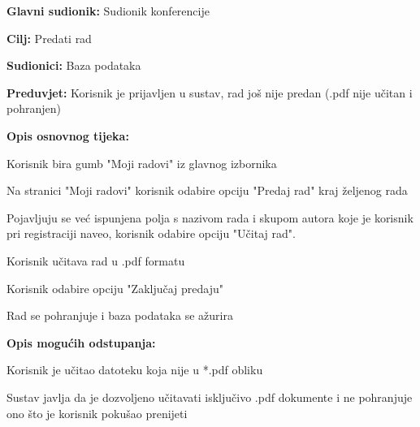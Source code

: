 					\noindent {}
					\begin{packed_item}
	
						\item \textbf{Glavni sudionik: } Sudionik konferencije
						\item  \textbf{Cilj:} Predati rad
						\item  \textbf{Sudionici:} Baza podataka
						\item  \textbf{Preduvjet:} Korisnik je prijavljen u sustav, rad još nije predan (.pdf nije učitan i pohranjen)
						\item  \textbf{Opis osnovnog tijeka:}
						
						\item[] \begin{packed_enum}

							\item Korisnik bira gumb "Moji radovi" iz glavnog izbornika	
							\item Na stranici "Moji radovi" korisnik odabire opciju "Predaj rad" kraj željenog rada
							\item Pojavljuju se već ispunjena polja s nazivom rada i skupom autora koje je korisnik pri registraciji naveo, korisnik odabire opciju "Učitaj rad".
							\item Korisnik učitava rad u .pdf formatu
							\item Korisnik odabire opciju "Zaključaj predaju"
							\item Rad se pohranjuje i baza podataka se ažurira

					
						\end{packed_enum}

						\item  \textbf{Opis mogućih odstupanja:}
						
						\item[] \begin{packed_item}
	
							\item[3.a]  Korisnik je učitao datoteku koja nije u *.pdf obliku
							\item[] \begin{packed_enum}
								
								\item Sustav javlja da je dozvoljeno učitavati isključivo .pdf dokumente i ne pohranjuje ono što je korisnik pokušao prenijeti
								
							\end{packed_enum}


\end{packed_item}
\end{packed_item}
